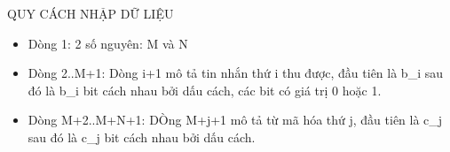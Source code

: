 QUY CÁCH NHẬP DỮ LIỆU  
\begin{itemize}
	\item     Dòng 1: 2 số nguyên: M và N   
	\item     Dòng 2..M+1: Dòng i+1 mô tả tin nhắn thứ i thu được, đầu tiên là b\_i         sau đó là b\_i bit cách nhau bởi dấu cách, các bit có giá trị 0 hoặc 1.   
	\item     Dòng M+2..M+N+1: DÒng M+j+1 mô tả từ mã hóa thứ j, đầu tiên là c\_j         sau đó là c\_j bit cách nhau bởi dấu cách.   
\end{itemize}